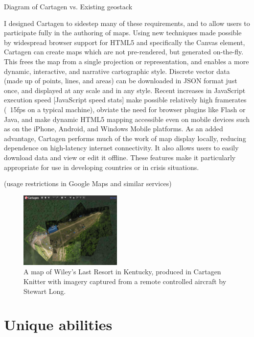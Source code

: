 \documentclass[11pt,oneside,notitlepage]{report}
\begin{document}
Diagram of Cartagen vs. Existing geostack

I designed Cartagen to sidestep many of these requirements, and to allow users to participate fully in the authoring of maps. Using new techniques made possible by widespread browser support for HTML5 and specifically the Canvas element, Cartagen can create maps which are not pre-rendered, but generated on-the-fly. This frees the map from a single projection or representation, and enables a more dynamic, interactive, and narrative cartographic style. Discrete vector data (made up of points, lines, and areas) can be downloaded in JSON format just once, and displayed at any scale and in any style. Recent increases in JavaScript execution speed [JavaScript speed stats] make possible relatively high framerates (~15fps on a typical machine), obviate the need for browser plugins like Flash or Java, and make dynamic HTML5 mapping accessible even on mobile devices such as on the iPhone, Android, and Windows Mobile platforms. As an added advantage, Cartagen performs much of the work of map display locally, reducing dependence on high-latency internet connectivity. It also allows users to easily download data and view or edit it offline. These features make it particularly appropriate for use in developing countries or in crisis situations. 

(usage restrictions in Google Maps and similar services)

\begin{figure}
	\begin{flushright}
		\includegraphics[width=0.45\textwidth]{images/knitter-wileys.png}
		\caption{A map of Wiley's Last Resort in Kentucky, produced in Cartagen Knitter with imagery captured from a remote controlled aircraft by Stewart Long.}
	\end{flushright}
\end{figure}

\section{Unique abilities}
\end{document}
